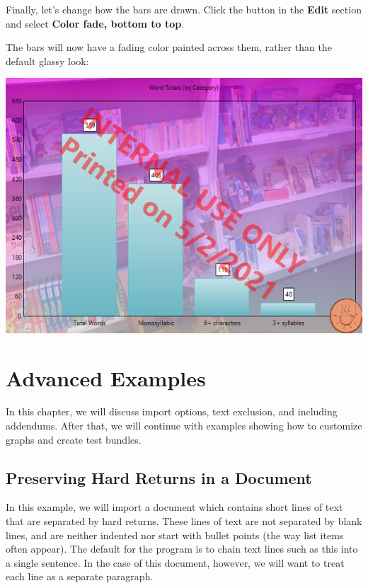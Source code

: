 \documentclass[
]{book}
\theoremstyle{definition}
\theoremstyle{definition}
\theoremstyle{definition}
\theoremstyle{definition}
\theoremstyle{remark}
\begin{document}
Finally, let's change how the bars are drawn. Click the  button in the \textbf{Edit} section and select \textbf{Color fade, bottom to top}.

The bars will now have a fading color painted across them, rather than the default glassy look:

\begin{center}\includegraphics[width=0.75\linewidth,]{Images/ExampleBarChartEffectsChanged} \end{center}

\hypertarget{advanced-examples}{%
\chapter{Advanced Examples}\label{advanced-examples}}

In this chapter, we will discuss import options, text exclusion, and including addendums. After that, we will continue with examples showing how to customize graphs and create test bundles.

\hypertarget{preserving-hard-returns-in-a-document}{%
\section{Preserving Hard Returns in a Document}\label{preserving-hard-returns-in-a-document}}

In this example, we will import a document which contains short lines of text that are separated by hard returns. These lines of text are not separated by blank lines, and are neither indented nor start with bullet points (the way list items often appear). The default for the program is to chain text lines such as this into a single sentence. In the case of this document, however, we will want to treat each line as a separate paragraph.
\end{document}
